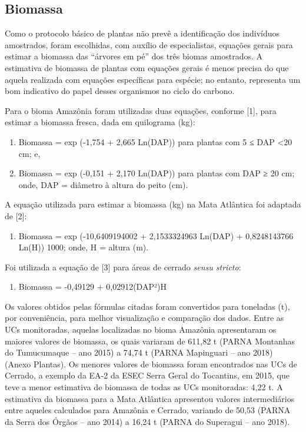 \documentclass[
  letterpaper,
]{scrbook}
\providecommand{\tightlist}{%
  \setlength{\itemsep}{0pt}\setlength{\parskip}{0pt}}\usepackage{longtable,booktabs,array}
\begin{document}
\subsection{Biomassa}\label{biomassa}

Como o protocolo básico de plantas não prevê a identificação dos
indivíduos amostrados, foram escolhidas, com auxílio de especialistas,
equações gerais para estimar a biomassa das ``árvores em pé'' dos três
biomas amostrados. A estimativa de biomassa de plantas com equações
gerais é menos precisa do que aquela realizada com equações específicas
para espécie; no entanto, representa um bom indicativo do papel desses
organismos no ciclo do carbono.

Para o bioma Amazônia foram utilizadas duas equações, conforme {[}1{]},
para estimar a biomassa fresca, dada em quilograma (kg):

\begin{enumerate}
\def\labelenumi{(\arabic{enumi})}
\item
  Biomassa = exp (-1,754 + 2,665 Ln(DAP)) para plantas com 5 ≤ DAP
  \textless20 cm; e,
\item
  Biomassa = exp (-0,151 + 2,170 Ln(DAP)) para plantas com DAP ≥ 20 cm;
  onde, DAP = diâmetro à altura do peito (cm).
\end{enumerate}

A equação utilizada para estimar a biomassa (kg) na Mata Atlântica foi
adaptada de {[}2{]}:

\begin{enumerate}
\def\labelenumi{(\arabic{enumi})}
\setcounter{enumi}{2}
\tightlist
\item
  Biomassa = exp (-10,6409194002 + 2,1533324963 Ln(DAP) + 0,8248143766
  Ln(H)) 1000; onde, H = altura (m).
\end{enumerate}

Foi utilizada a equação de {[}3{]} para áreas de cerrado \emph{sensu
stricto}:

\begin{enumerate}
\def\labelenumi{(\arabic{enumi})}
\setcounter{enumi}{3}
\tightlist
\item
  Biomassa = -0,49129 + 0,02912(DAP²)H
\end{enumerate}

Os valores obtidos pelas fórmulas citadas foram convertidos para
toneladas (t), por conveniência, para melhor visualização e comparação
dos dados. Entre as UCs monitoradas, aquelas localizadas no bioma
Amazônia apresentaram os maiores valores de biomassa, os quais variaram
de 611,82 t (PARNA Montanhas do Tumucumaque -- ano 2015) a 74,74 t
(PARNA Mapinguari -- ano 2018) (Anexo Plantas). Os menores valores de
biomassa foram encontrados nas UCs de Cerrado, a exemplo da EA-2 da ESEC
Serra Geral do Tocantins, em 2015, que teve a menor estimativa de
biomassa de todas as UCs monitoradas: 4,22 t. A estimativa da biomassa
para a Mata Atlântica apresentou valores intermediários entre aqueles
calculados para Amazônia e Cerrado, variando de 50,53 (PARNA da Serra
dos Órgãos -- ano 2014) a 16,24 t (PARNA do Superagui -- ano 2018).
\end{document}
